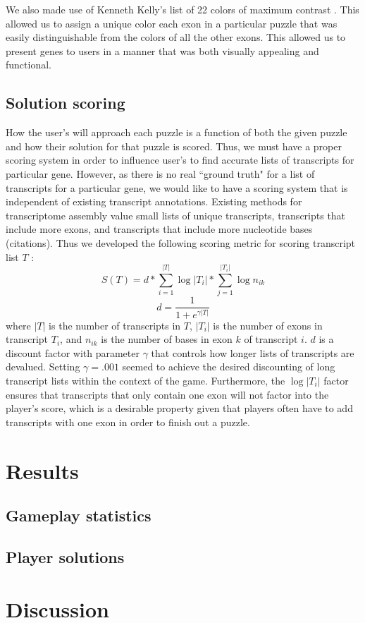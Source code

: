 \documentclass[12pt,twocolumn]{article}
\begin{document}
We also made use of Kenneth Kelly's list of 22 colors of maximum contrast \citep{green2010colour}. This allowed us to assign a unique color each exon
in a particular puzzle that was easily distinguishable from the colors of all the other exons. This allowed us to present genes to 
users in a manner that was both visually appealing and functional.

\subsection*{Solution scoring}
How the user's will approach each puzzle is a function of both the given puzzle and how their solution for that puzzle is scored. Thus, we must have
a proper scoring system in order to influence user's to find accurate lists of transcripts for particular gene. However, as there is no real ``ground truth"
for a list of transcripts for a particular gene, we would like to have a scoring system that is independent of existing transcript annotations. Existing methods
for transcriptome assembly value small lists of unique transcripts, transcripts that include more exons, and transcripts that include more nucleotide bases (citations).
Thus we developed the following scoring metric for scoring transcript list $T$ :
\begin{equation*}
S(T) = d * \sum_{i=1}^{|T|} \log{|T_i|} * \sum_{j = 1}^{|T_i|} \log{n_{ik}}
\end{equation*}
\begin{equation*}
d = \frac{1}{1+e^{\gamma |T|}}
\end{equation*}
where $|T|$ is the number of transcripts in $T$, $|T_i|$ is the number of exons in transcript $T_i$, and $n_{ik}$ is the number of bases in exon $k$ of transcript $i$.
$d$ is a discount factor with parameter $\gamma$ that controls how longer lists of transcripts are devalued. Setting $\gamma = .001$ seemed to achieve the desired
discounting of long transcript lists within the context of the game. Furthermore, the $\log{|T_i|}$ factor ensures that transcripts that only contain one exon will not factor
into the player's score, which is a desirable property given that players often have to add transcripts with one exon in order to finish out a puzzle.

\section*{Results}

\subsection*{Gameplay statistics}

\subsection*{Player solutions}

\section*{Discussion}


\end{document}
